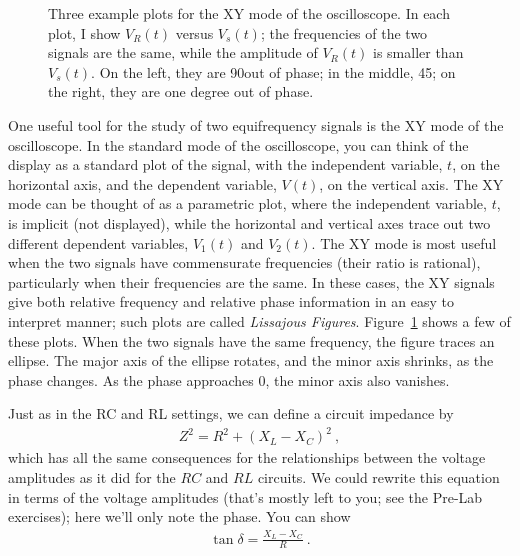 \documentclass[12pt]{article}
\begin{document}
\begin{figure}
  \centering
  \caption{Three example plots for the XY mode of the oscilloscope.
    In each plot, I show $V_R(t)$ versus $V_s(t)$; the frequencies of
    the two signals are the same, while the amplitude of $V_R(t)$ is
    smaller than $V_s(t)$.  On the left, they are 90\textdegree out of
    phase; in the middle, 45\textdegree; on the right, they are one
    degree out of phase.}
  \label{fig:lissajous}
\end{figure}
One useful tool for the study of two equifrequency signals is the XY
mode of the oscilloscope.  In the standard mode of the oscilloscope,
you can think of the display as a standard plot of the signal, with
the independent variable, $t$, on the horizontal axis, and the
dependent variable, $V(t)$, on the vertical axis.  The XY mode can be
thought of as a parametric plot, where the independent variable, $t$,
is implicit (not displayed), while the horizontal and vertical axes
trace out two different dependent variables, $V_1(t)$ and $V_2(t)$.
The XY mode is most useful when the two signals have commensurate
frequencies (their ratio is rational), particularly when their
frequencies are the same.  In these cases, the XY signals give both
relative frequency and relative phase information in an easy to
interpret manner; such plots are called \textit{Lissajous
  Figures}. Figure~\ref{fig:lissajous} shows a few of these plots.
When the two signals have the same frequency, the figure traces an
ellipse.  The major axis of the ellipse rotates, and the minor axis
shrinks, as the phase changes.  As the phase approaches 0, the minor
axis also vanishes.

Just as in the RC and RL settings, we can define a circuit impedance
by
\begin{gather*}
  Z^2 = R^2 + \left(X_L-X_C\right)^2\ ,
\end{gather*}
which has all the same consequences for the relationships between the
voltage amplitudes as it did for the $RC$ and $RL$ circuits.  We could
rewrite this equation in terms of the voltage amplitudes (that's
mostly left to you; see the Pre-Lab exercises); here we'll only note
the phase.  You can show
\begin{gather*}
  \tan \delta = \frac{X_L - X_C}{R}\ .
\end{gather*}
\end{document}
